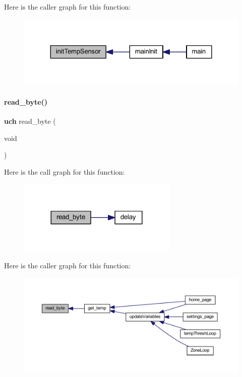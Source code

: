 Here is the caller graph for this function\+:
\nopagebreak
\begin{figure}[H]
\begin{center}
\leavevmode
\includegraphics[width=324pt]{a00047_a6f113d0c9396301bb878730ed4018e44_icgraph}
\end{center}
\end{figure}
\mbox{\label{a00047_ab39a58e9f8e972b890434144956e4f5d}} 
\paragraph{read\+\_\+byte()}
{\footnotesize\ttfamily \textbf{ uch} read\+\_\+byte (\begin{DoxyParamCaption}\item[{void}]{ }\end{DoxyParamCaption})}

Here is the call graph for this function\+:
\nopagebreak
\begin{figure}[H]
\begin{center}
\leavevmode
\includegraphics[width=215pt]{a00047_ab39a58e9f8e972b890434144956e4f5d_cgraph}
\end{center}
\end{figure}
Here is the caller graph for this function\+:
\nopagebreak
\begin{figure}[H]
\begin{center}
\leavevmode
\includegraphics[width=350pt]{a00047_ab39a58e9f8e972b890434144956e4f5d_icgraph}
\end{center}
\end{figure}
\mbox{\label{a00047_a3aea9deb2a0bfea9ff05a898f4822e31}} 
